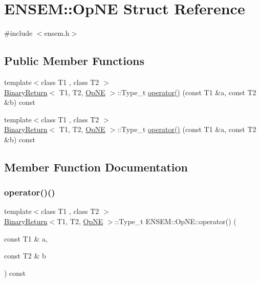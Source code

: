 \hypertarget{structENSEM_1_1OpNE}{}\section{E\+N\+S\+EM\+:\+:Op\+NE Struct Reference}
\label{structENSEM_1_1OpNE}


{\ttfamily \#include $<$ensem.\+h$>$}

\subsection*{Public Member Functions}
\begin{DoxyCompactItemize}
\item 
{\footnotesize template$<$class T1 , class T2 $>$ }\\\mbox{\hyperlink{structENSEM_1_1BinaryReturn}{Binary\+Return}}$<$ T1, T2, \mbox{\hyperlink{structENSEM_1_1OpNE}{Op\+NE}} $>$\+::Type\+\_\+t \mbox{\hyperlink{structENSEM_1_1OpNE_a7591dc1f0aa2c67130ef3ec7a406f54e}{operator()}} (const T1 \&a, const T2 \&b) const
\item 
{\footnotesize template$<$class T1 , class T2 $>$ }\\\mbox{\hyperlink{structENSEM_1_1BinaryReturn}{Binary\+Return}}$<$ T1, T2, \mbox{\hyperlink{structENSEM_1_1OpNE}{Op\+NE}} $>$\+::Type\+\_\+t \mbox{\hyperlink{structENSEM_1_1OpNE_a7591dc1f0aa2c67130ef3ec7a406f54e}{operator()}} (const T1 \&a, const T2 \&b) const
\end{DoxyCompactItemize}


\subsection{Member Function Documentation}
\mbox{\label{structENSEM_1_1OpNE_a7591dc1f0aa2c67130ef3ec7a406f54e}} 
\subsubsection{\texorpdfstring{operator()()}{operator()()}\hspace{0.1cm}{\footnotesize\ttfamily [1/2]}}
{\footnotesize\ttfamily template$<$class T1 , class T2 $>$ \\
\mbox{\hyperlink{structENSEM_1_1BinaryReturn}{Binary\+Return}}$<$T1, T2, \mbox{\hyperlink{structENSEM_1_1OpNE}{Op\+NE}} $>$\+::Type\+\_\+t E\+N\+S\+E\+M\+::\+Op\+N\+E\+::operator() (\begin{DoxyParamCaption}\item[{const T1 \&}]{a,  }\item[{const T2 \&}]{b }\end{DoxyParamCaption}) const\hspace{0.3cm}{\ttfamily [inline]}}

